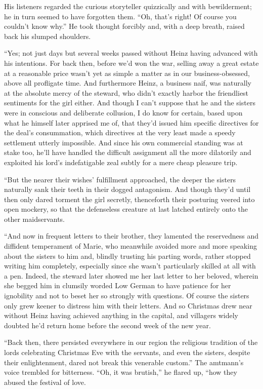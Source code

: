 \documentclass[12pt,a4paper]{article}
\begin{document}
His listeners regarded the curious storyteller quizzically and with bewilderment; he in turn seemed to have forgotten them. “Oh, that’s right! Of course you couldn’t know why.” He took thought forcibly and, with a deep breath, raised back his slumped shoulders.

“Yes; not just days but several weeks passed without Heinz having advanced with his intentions. For back then, before we’d won the war, selling away a great estate at a reasonable price wasn’t yet as simple a matter as in our business-obsessed, above all profligate time. And furthermore Heinz, a business naif, was naturally at the absolute mercy of the steward, who didn’t exactly harbor the friendliest sentiments for the girl either. And though I can’t suppose that he and the sisters were in conscious and deliberate collusion, I do know for certain, based upon what he himself later apprised me of, that they’d issued him specific directives for the deal’s consummation, which directives at the very least made a speedy settlement utterly impossible. And since his own commercial standing was at stake too, he’ll have handled the difficult assignment all the more dilatorily and exploited his lord’s indefatigable zeal subtly for a mere cheap pleasure trip.

“But the nearer their wishes’ fulfillment approached, the deeper the sisters naturally sank their teeth in their dogged antagonism. And though they’d until then only dared torment the girl secretly, thenceforth their posturing veered into open mockery, so that the defenseless creature at last latched entirely onto the other maidservants.

“And now in frequent letters to their brother, they lamented the reservedness and diffident temperament of Marie, who meanwhile avoided more and more speaking about the sisters to him and, blindly trusting his parting words, rather stopped writing him completely, especially since she wasn’t particularly skilled at all with a pen. Indeed, the steward later showed me her last letter to her beloved, wherein she begged him in clumsily worded Low German to have patience for her ignobility and not to beset her so strongly with questions. Of course the sisters only grew keener to distress him with their letters. And so Christmas drew near without Heinz having achieved anything in the capital, and villagers widely doubted he’d return home before the second week of the new year.

“Back then, there persisted everywhere in our region the religious tradition of the lords celebrating Christmas Eve with the servants, and even the sisters, despite their enlightenment, dared not break this venerable custom.” The amtmann’s voice trembled for bitterness. “Oh, it was brutish,” he flared up, “how they abused the festival of love.
\end{document}
